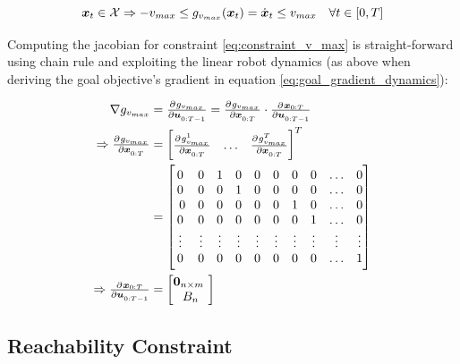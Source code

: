 \begin{equation}
\boldsymbol{x}_t \in \mathcal{X} \Rightarrow -v_{max} \leq g_{v_{max}}(\boldsymbol{x}_t) = \dot{\boldsymbol{x}}_t \leq v_{max} \quad \forall t \in [0, T]
\label{eq:constraint_v_max}
\end{equation}

Computing the jacobian for constraint \ref{eq:constraint_v_max} is straight-forward using chain rule and exploiting the linear robot dynamics (as above when deriving the goal objective's gradient in equation \ref{eq:goal_gradient_dynamics}):  

\begin{align}
\nabla g_{v_{max}} &= \pd{g_{v_{max}}}{\u_{0:T-1}} = \pd{g_{v_{max}}}{\x_{0:T}} \cdot \pd{\x_{0:T}}{\u_{0:T-1}} \\
\Rightarrow \pd{g_{v_{max}}}{\x_{0:T}} &= \begin{bmatrix} \pd{g_{v_{max}}^1}{\x_{0:T}} & \hdots & \pd{g_{v_{max}}^T}{\x_{0:T}}\end{bmatrix}^T  \\
&= \begin{bmatrix} 
0 & 0 & 1 & 0 & 0 & 0 & 0 & 0 & \hdots & 0 \\ 
0 & 0 & 0 & 1 & 0 & 0 & 0 & 0 & \hdots & 0 \\  
0 & 0 & 0 & 0 & 0 & 0 & 1 & 0 & \hdots & 0 \\
0 & 0 & 0 & 0 & 0 & 0 & 0 & 1 & \hdots & 0 \\ 
\vdots & \vdots & \vdots & \vdots & \vdots & \vdots & \vdots & \vdots & \vdots & \vdots \\
0 & 0 & 0 & 0 & 0 & 0 & 0 & 0 & \hdots & 1 \end{bmatrix} \\
\Rightarrow \pd{\x_{0:T}}{\u_{0:T-1}} &= \begin{bmatrix} \mathbf{0}_{n \times m} \\ B_n \end{bmatrix}
\end{align}
 

\subsection{Reachability Constraint}
\label{text:approach/constraint/reachability}


